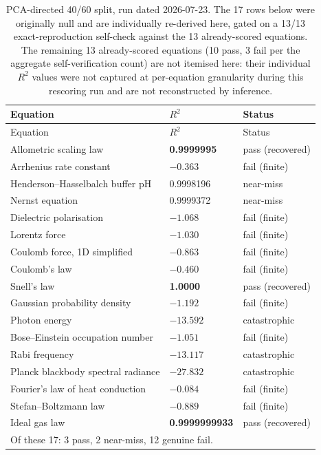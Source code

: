 \documentclass[twoside,11pt]{article}
\newcommand{\Rsq}{R^{2}}
\begin{document}
\begin{longtable}{p{4.8cm}p{1.6cm}p{2.9cm}}
\caption{PCA-directed 40/60 split, run dated 2026-07-23. The 17 rows below
  were originally null and are individually re-derived here, gated on a
  13/13 exact-reproduction self-check against the 13 already-scored
  equations. The remaining 13 already-scored equations (10 pass, 3 fail per
  the aggregate self-verification count) are not itemised here: their
  individual $\Rsq$ values were not captured at per-equation granularity
  during this rescoring run and are not reconstructed by inference.}
\label{tab:pcasplit}\\
\toprule
Equation & $\Rsq$ & Status \\
\midrule
\endfirsthead
\toprule
Equation & $\Rsq$ & Status \\
\midrule
\endhead
Allometric scaling law & \textbf{0.9999995} & pass (recovered) \\
Arrhenius rate constant & $-0.363$ & fail (finite) \\
Henderson--Hasselbalch buffer pH & 0.9998196 & near-miss \\
Nernst equation & 0.9999372 & near-miss \\
Dielectric polarisation & $-1.068$ & fail (finite) \\
Lorentz force & $-1.030$ & fail (finite) \\
Coulomb force, 1D simplified & $-0.863$ & fail (finite) \\
Coulomb's law & $-0.460$ & fail (finite) \\
Snell's law & \textbf{1.0000} & pass (recovered) \\
Gaussian probability density & $-1.192$ & fail (finite) \\
Photon energy & $-13.592$ & catastrophic \\
Bose--Einstein occupation number & $-1.051$ & fail (finite) \\
Rabi frequency & $-13.117$ & catastrophic \\
Planck blackbody spectral radiance & $-27.832$ & catastrophic \\
Fourier's law of heat conduction & $-0.084$ & fail (finite) \\
Stefan--Boltzmann law & $-0.889$ & fail (finite) \\
Ideal gas law & \textbf{0.9999999933} & pass (recovered) \\
\midrule
\multicolumn{3}{l}{Of these 17: 3 pass, 2 near-miss, 12 genuine fail.} \\
\bottomrule
\end{longtable}
\end{document}
